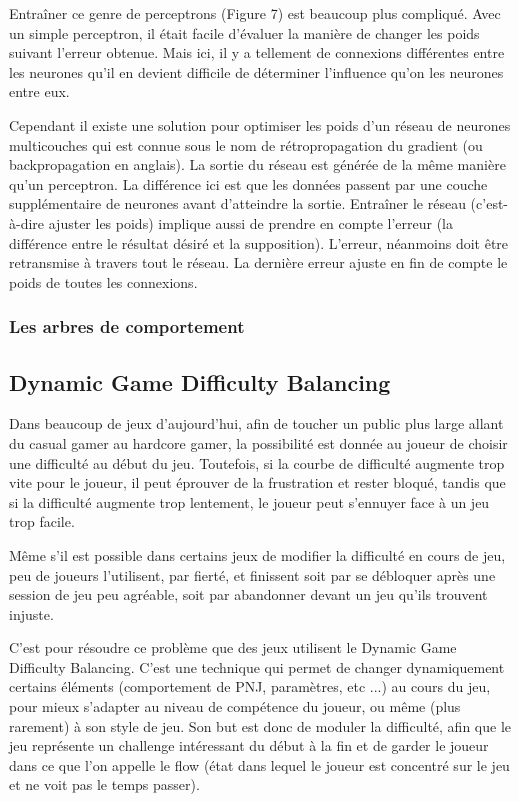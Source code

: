 \documentclass[a4paper, 12pt]{article} %
\begin{document}
Entraîner ce genre de perceptrons (Figure 7) est beaucoup plus compliqué. Avec un simple perceptron, il était facile d’évaluer la manière de changer les poids suivant l’erreur obtenue. Mais ici, il y a tellement de connexions différentes entre les neurones qu’il en devient difficile de déterminer l’influence qu’on les neurones entre eux.

Cependant il existe une solution pour optimiser les poids d’un réseau de neurones multicouches qui est connue sous le nom de rétropropagation du gradient (ou backpropagation en anglais). La sortie du réseau est générée de la même manière qu’un perceptron. La différence ici est que les données passent par une couche supplémentaire de neurones avant d’atteindre la sortie. Entraîner le réseau (c’est-à-dire ajuster les poids) implique aussi de prendre en compte l’erreur (la différence entre le résultat désiré et la supposition). L’erreur, néanmoins doit être retransmise à travers tout le réseau. La dernière erreur ajuste en fin de compte le poids de toutes les connexions.

\newpage
\subsubsection{Les arbres de comportement}

\newpage
\subsection{Dynamic Game Difficulty Balancing}

Dans beaucoup de jeux d’aujourd’hui, afin de toucher un public plus large allant du casual gamer au hardcore gamer, la possibilité est donnée au joueur de choisir une difficulté au début du jeu. Toutefois, si la courbe de difficulté augmente trop vite pour le joueur, il peut éprouver de la frustration et rester bloqué, tandis que si la difficulté augmente trop lentement, le joueur peut s’ennuyer face à un jeu trop facile.

Même s’il est possible dans certains jeux de modifier la difficulté en cours de jeu, peu de joueurs l’utilisent, par fierté, et finissent soit par se débloquer après une session de jeu peu agréable, soit par abandonner devant un jeu qu’ils trouvent injuste.

C’est pour résoudre ce problème que des jeux utilisent le Dynamic Game Difficulty Balancing. C’est une technique qui permet de changer dynamiquement certains éléments (comportement de PNJ, paramètres, etc ...) au cours du jeu, pour mieux s’adapter au niveau de compétence du joueur, ou même (plus rarement) à son style de jeu. Son but est donc de moduler la difficulté, afin que le jeu représente un challenge intéressant du début à la fin et de garder le joueur dans ce que l'on appelle le flow (état dans lequel le joueur est concentré sur le jeu et ne voit pas le temps passer).
\end{document}
